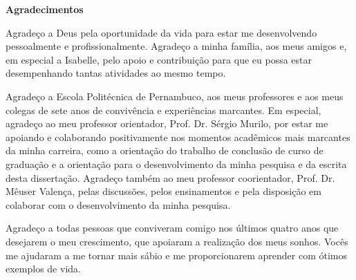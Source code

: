 \begin{flushbottom}
\begin{flushleft}
{\huge \textbf{Agradecimentos}}
\linebreak
\linebreak
\end{flushleft}

Agradeço a Deus pela oportunidade da vida para estar me desenvolvendo pessoalmente e profissionalmente. Agradeço a minha família, aos meus amigos e, em especial a Isabelle, pelo apoio e contribuição para que eu possa estar desempenhando tantas atividades ao mesmo tempo.

Agradeço a Escola Politécnica de Pernambuco, aos meus professores e aos meus colegas de sete anos de convivência e experiências marcantes. Em especial, agradeço ao meu professor orientador, Prof. Dr. Sérgio Murilo, por estar me apoiando e colaborando positivamente nos momentos acadêmicos mais marcantes da minha carreira, como a orientação do trabalho de conclusão de curso de graduação e a orientação para o desenvolvimento da minha pesquisa e da escrita desta dissertação. Agradeço também ao meu professor coorientador, Prof. Dr. Mêuser Valença, pelas discussões, pelos ensinamentos e pela disposição em colaborar com o desenvolvimento da minha pesquisa.


Agradeço a todas pessoas que conviveram comigo nos últimos quatro anos que desejarem o meu crescimento, que apoiaram a realização dos meus sonhos. Vocês me ajudaram a me tornar mais sábio e me proporcionarem aprender com ótimos exemplos de vida.

\end{flushbottom}
\newpage
